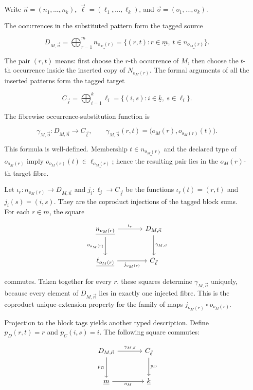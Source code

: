 \documentclass[11pt]{article}
\newcommand{\finord}[1]{\underline{#1}}
\theoremstyle{definition}
\begin{document}
Write \(\vec n=(n_1,\ldots,n_k)\),
\(\vec\ell=(\ell_1,\ldots,\ell_k)\), and
\(\vec o=(o_1,\ldots,o_k)\).

The occurrences in the substituted pattern form the tagged source

\[
D_{M,\vec n}
=\bigoplus_{r=1}^{m}\finord{n_{o_M(r)}}
=\{(r,t):r\in\finord m,\ t\in\finord{n_{o_M(r)}}\}.
\]

The pair \((r,t)\) means: first choose the \(r\)-th occurrence of \(M\), then
choose the \(t\)-th occurrence inside the inserted copy of
\(N_{o_M(r)}\). The formal arguments of all the inserted patterns form the
tagged target

\[
C_{\vec\ell}
=\bigoplus_{i=1}^{k}\finord{\ell_i}
=\{(i,s):i\in\finord k,\ s\in\finord{\ell_i}\}.
\]

The fibrewise occurrence-substitution function is

\[
\gamma_{M,\vec o}:D_{M,\vec n}\longrightarrow C_{\vec\ell},
\qquad
\gamma_{M,\vec o}(r,t)
=\bigl(o_M(r),o_{o_M(r)}(t)\bigr).
\]

This formula is well-defined. Membership
\(t\in\finord{n_{o_M(r)}}\) and the declared type of
\(o_{o_M(r)}\) imply
\(o_{o_M(r)}(t)\in\finord{\ell_{o_M(r)}}\); hence the resulting pair lies in
the \(o_M(r)\)-th target fibre.

Let
\(\iota_r:\finord{n_{o_M(r)}}\to D_{M,\vec n}\) and
\(j_i:\finord{\ell_i}\to C_{\vec\ell}\) be the functions
\(\iota_r(t)=(r,t)\) and \(j_i(s)=(i,s)\). They are the coproduct
injections of the tagged block sums. For each \(r\in\finord m\), the square

\[
\begin{tikzcd}[row sep=large,column sep=large]
\finord{n_{o_M(r)}} \arrow[r,"\iota_r"]
  \arrow[d,"o_{o_M(r)}"'] &
D_{M,\vec n} \arrow[d,"\gamma_{M,\vec o}"] \\
\finord{\ell_{o_M(r)}} \arrow[r,"j_{o_M(r)}"'] & C_{\vec\ell}
\end{tikzcd}
\]

commutes. Taken together for every \(r\), these squares determine
\(\gamma_{M,\vec o}\) uniquely, because every element of
\(D_{M,\vec n}\) lies in exactly one injected fibre.
This is the coproduct unique-extension property for the family of maps
\(j_{o_M(r)}\circ o_{o_M(r)}\).

Projection to the block tags yields another typed description. Define
\(p_D(r,t)=r\) and \(p_C(i,s)=i\). The following square commutes:

\[
\begin{tikzcd}[row sep=large,column sep=large]
D_{M,\vec n} \arrow[r,"\gamma_{M,\vec o}"] \arrow[d,"p_D"'] &
C_{\vec\ell} \arrow[d,"p_C"] \\
\finord m \arrow[r,"o_M"'] & \finord k
\end{tikzcd}
\]
\end{document}
